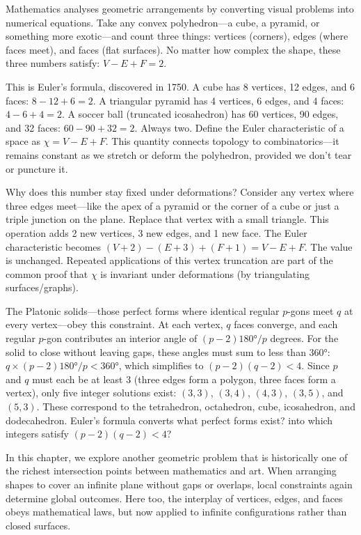 Mathematics analyses geometric arrangements by converting visual problems into numerical equations. Take any convex polyhedron—a cube, a pyramid, or something more exotic—and count three things: vertices (corners), edges (where faces meet), and faces (flat surfaces). No matter how complex the shape, these three numbers satisfy: $V - E + F = 2$.

This is Euler's formula, discovered in 1750. A cube has 8 vertices, 12 edges, and 6 faces: $8 - 12 + 6 = 2$. A triangular pyramid has 4 vertices, 6 edges, and 4 faces: $4 - 6 + 4 = 2$. A soccer ball (truncated icosahedron) has 60 vertices, 90 edges, and 32 faces: $60 - 90 + 32 = 2$. Always two. Define the Euler characteristic of a space as $\chi = V - E + F$. This quantity connects topology to combinatorics—it remains constant as we stretch or deform the polyhedron, provided we don't tear or puncture it.

Why does this number stay fixed under deformations? Consider any vertex where three edges meet—like the apex of a pyramid or the corner of a cube or just a triple junction on the plane. Replace that vertex with a small triangle. This operation adds 2 new vertices, 3 new edges, and 1 new face. The Euler characteristic becomes $(V + 2) - (E + 3) + (F + 1) = V - E + F$. The value is unchanged. Repeated applications of this \QSOpen{}vertex truncation\QSClose{} are part of the common proof that $\chi$ is invariant under deformations (by triangulating surfaces/graphs).

The Platonic solids—those perfect forms where identical regular $p$-gons meet $q$ at every vertex—obey this constraint. At each vertex, $q$ faces converge, and each regular $p$-gon contributes an interior angle of $(p-2)180°/p$ degrees. For the solid to close without leaving gaps, these angles must sum to less than $360°$: $q \times (p-2)180°/p < 360°$, which simplifies to $(p-2)(q-2) < 4$. Since $p$ and $q$ must each be at least 3 (three edges form a polygon, three faces form a vertex), only five integer solutions exist: $(3,3)$, $(3,4)$, $(4,3)$, $(3,5)$, and $(5,3)$. These correspond to the tetrahedron, octahedron, cube, icosahedron, and dodecahedron. Euler's formula converts \QSOpen{}what perfect forms exist?\QSClose{} into \QSOpen{}which integers satisfy $(p-2)(q-2) < 4$?\QSClose{}

In this chapter, we explore another geometric problem that is historically one of the richest intersection points between mathematics and art. When arranging shapes to cover an infinite plane without gaps or overlaps, local constraints again determine global outcomes. Here too, the interplay of vertices, edges, and faces obeys mathematical laws, but now applied to infinite configurations rather than closed surfaces.

